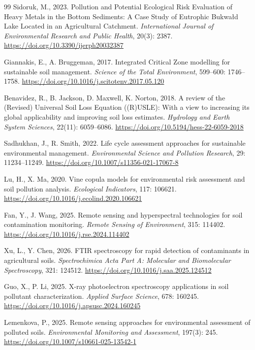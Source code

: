 \documentclass[sn-mathphys-num]{sn-jnl}
\begin{document}
\begin{thebibliography}{99}
Sidoruk, M., 2023.
Pollution and Potential Ecological Risk Evaluation of Heavy Metals in the Bottom Sediments: A Case Study of Eutrophic Bukwałd Lake Located in an Agricultural Catchment.
\textit{International Journal of Environmental Research and Public Health}, 20(3): 2387.
\url{https://doi.org/10.3390/ijerph20032387}

Giannakis, E., A. Bruggeman, 2017.
Integrated Critical Zone modelling for sustainable soil management.
\textit{Science of the Total Environment}, 599--600: 1746--1758.
\url{https://doi.org/10.1016/j.scitotenv.2017.05.120}

Benavidez, R., B. Jackson, D. Maxwell, K. Norton, 2018.
A review of the (Revised) Universal Soil Loss Equation ((R)USLE): With a view
to increasing its global applicability and improving soil loss estimates.
\textit{Hydrology and Earth System Sciences}, 22(11): 6059--6086.
\url{https://doi.org/10.5194/hess-22-6059-2018}

Sadhukhan, J., R. Smith, 2022.
Life cycle assessment approaches for sustainable environmental management.
\textit{Environmental Science and Pollution Research}, 29: 11234--11249.
\url{https://doi.org/10.1007/s11356-021-17067-8}

Lu, H., X. Ma, 2020.
Vine copula models for environmental risk assessment and soil pollution
analysis.
\textit{Ecological Indicators}, 117: 106621.
\url{https://doi.org/10.1016/j.ecolind.2020.106621}

Fan, Y., J. Wang, 2025.
Remote sensing and hyperspectral technologies for soil contamination
monitoring.
\textit{Remote Sensing of Environment}, 315: 114402.
\url{https://doi.org/10.1016/j.rse.2024.114402}

Xu, L., Y. Chen, 2026.
FTIR spectroscopy for rapid detection of contaminants in agricultural soils.
\textit{Spectrochimica Acta Part A: Molecular and Biomolecular Spectroscopy},
321: 124512.
\url{https://doi.org/10.1016/j.saa.2025.124512}

Guo, X., P. Li, 2025.
X-ray photoelectron spectroscopy applications in soil pollutant
characterization.
\textit{Applied Surface Science}, 678: 160245.
\url{https://doi.org/10.1016/j.apsusc.2024.160245}

Lemenkova, P., 2025.
Remote sensing approaches for environmental assessment of polluted soils.
\textit{Environmental Monitoring and Assessment}, 197(3): 245.
\url{https://doi.org/10.1007/s10661-025-13542-1}


\end{thebibliography}
\end{document}
